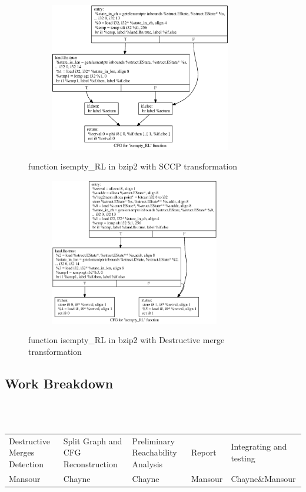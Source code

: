 \documentclass{article}
\begin{document}
\begin{figure}[H]
\begin{subfigure}{1\textwidth}
  \centering
\includegraphics[width=300px]{bzip2-example-sccp} 
\end{subfigure}
\caption{function isempty\_RL in bzip2 with SCCP transformation}
\label{fig:test}
\end{figure}

\begin{figure}[H]
\begin{subfigure}{1\textwidth}
  \centering
\includegraphics[width=280px]{bzip2-example-dm} 
\end{subfigure}%
\caption{function isempty\_RL in bzip2 with Destructive merge transformation}
\label{fig:test}
\end{figure}


\subsection{Work Breakdown}
~\\~
\begin{adjustbox}{center}
\renewcommand{\arraystretch}{2}
\begin{tabular}{| C{3cm} | C{3cm} | C{3cm} | C{3cm} | C{3cm} |}
\hline
Destructive Merges Detection & Split Graph and CFG Reconstruction & Preliminary Reachability Analysis & Report & Integrating and testing \\  
Mansour & Chayne & Chayne & Mansour &  Chayne\&Mansour \\ 

\end{tabular}
\end{adjustbox}
\end{document}
